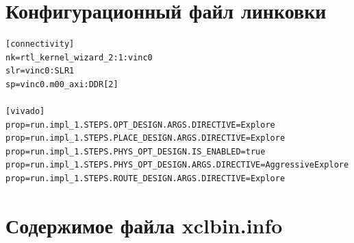 \clearpage

\section{Конфигурационный файл линковки}

\lstset{
	frame=none,
	numbers=none,
	breaklines=true
}

\begin{lstlisting}
[connectivity]
nk=rtl_kernel_wizard_2:1:vinc0
slr=vinc0:SLR1
sp=vinc0.m00_axi:DDR[2]

[vivado]
prop=run.impl_1.STEPS.OPT_DESIGN.ARGS.DIRECTIVE=Explore
prop=run.impl_1.STEPS.PLACE_DESIGN.ARGS.DIRECTIVE=Explore
prop=run.impl_1.STEPS.PHYS_OPT_DESIGN.IS_ENABLED=true
prop=run.impl_1.STEPS.PHYS_OPT_DESIGN.ARGS.DIRECTIVE=AggressiveExplore
prop=run.impl_1.STEPS.ROUTE_DESIGN.ARGS.DIRECTIVE=Explore
\end{lstlisting}

\section{Содержимое файла xclbin.info}

